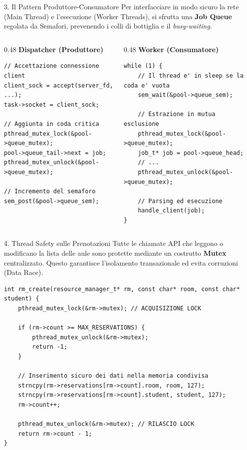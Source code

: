 \documentclass[aspectratio=169, 10pt]{beamer}
\begin{document}
\begin{frame}[fragile]{3. Il Pattern Produttore-Consumatore}
    Per interfacciare in modo sicuro la rete (Main Thread) e l'esecuzione (Worker Threads), si sfrutta una \textbf{Job Queue} regolata da Semafori, prevenendo i colli di bottiglia e il \textit{busy-waiting}.
    
    \begin{columns}
        \begin{column}{0.48\textwidth}
            \textbf{Dispatcher (Produttore)}
\begin{lstlisting}[style=cstyle]
// Accettazione connessione client
client_sock = accept(server_fd, ...);
task->socket = client_sock;

// Aggiunta in coda critica
pthread_mutex_lock(&pool->queue_mutex);
pool->queue_tail->next = job;
pthread_mutex_unlock(&pool->queue_mutex);

// Incremento del semaforo
sem_post(&pool->queue_sem);
\end{lstlisting}
        \end{column}
        
        \begin{column}{0.48\textwidth}
            \textbf{Worker (Consumatore)}
\begin{lstlisting}[style=cstyle]
while (1) {
    // Il thread e' in sleep se la coda e' vuota
    sem_wait(&pool->queue_sem);
    
    // Estrazione in mutua esclusione
    pthread_mutex_lock(&pool->queue_mutex);
    job_t* job = pool->queue_head;
    // ...
    pthread_mutex_unlock(&pool->queue_mutex);
    
    // Parsing ed esecuzione
    handle_client(job);
}
\end{lstlisting}
        \end{column}
    \end{columns}
\end{frame}

\begin{frame}[fragile]{4. Thread Safety sulle Prenotazioni}
    Tutte le chiamate API che leggono o modificano la lista delle aule sono protette mediante un costrutto \textbf{Mutex} centralizzato. Questo garantisce l'isolamento transazionale ed evita corruzioni (Data Race).
    
\begin{lstlisting}[style=cstyle]
int rm_create(resource_manager_t* rm, const char* room, const char* student) {
    pthread_mutex_lock(&rm->mutex); // ACQUISIZIONE LOCK
    
    if (rm->count >= MAX_RESERVATIONS) {
        pthread_mutex_unlock(&rm->mutex);
        return -1;
    }
    
    // Inserimento sicuro dei dati nella memoria condivisa
    strncpy(rm->reservations[rm->count].room, room, 127);
    strncpy(rm->reservations[rm->count].student, student, 127);
    rm->count++;
    
    pthread_mutex_unlock(&rm->mutex); // RILASCIO LOCK
    return rm->count - 1;
}
\end{lstlisting}
\end{frame}
\end{document}
